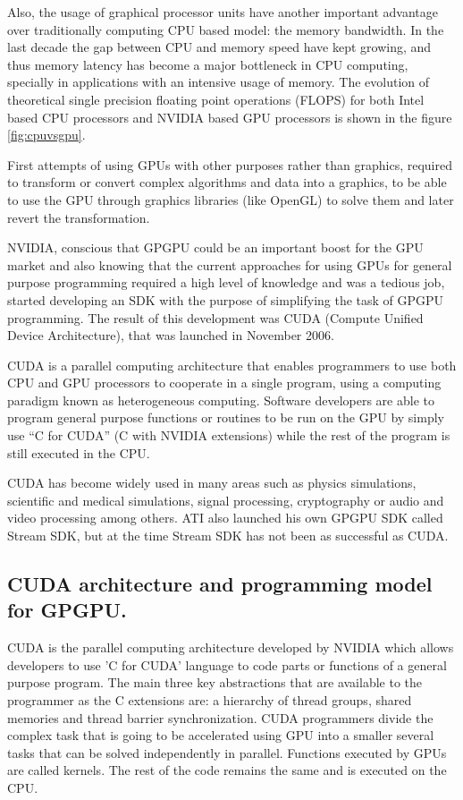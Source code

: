 \documentclass[thesis=M,english]{FITthesis}[2011/07/15]
\begin{document}
Also, the usage of graphical processor units have another important advantage over traditionally computing CPU based model: the memory bandwidth. In the last decade the gap between CPU and memory speed have kept growing, and thus memory latency has become a major bottleneck in CPU computing, specially in applications with an intensive usage of memory. The evolution of theoretical single precision floating point operations (FLOPS) for both Intel based CPU processors and NVIDIA based GPU processors is shown in the figure \ref{fig:cpuvsgpu}. 

First attempts of using GPUs with other purposes rather than graphics, required to transform or convert complex algorithms and data into a graphics, to be able to use the GPU through graphics libraries (like OpenGL) to solve them and later revert the transformation. 

NVIDIA, conscious that GPGPU could be an important boost for the GPU market and also knowing that the current approaches for using GPUs for general purpose programming required a high level of knowledge and was a tedious job, started developing an SDK with the purpose of simplifying the task of GPGPU programming. The result of this development was CUDA (Compute Unified Device Architecture), that was launched in November 2006. 

CUDA is a parallel computing architecture that enables programmers to use both CPU and GPU processors to cooperate in a single program, using a computing paradigm known as heterogeneous computing. Software developers are able to program general purpose functions or routines to be run on the GPU by simply use “C for CUDA” (C with NVIDIA extensions) while the rest of the program is still executed in the CPU. 

CUDA has become widely used in many areas such as physics simulations, scientific and medical simulations, signal processing, cryptography or audio and video processing among others. ATI also launched his own GPGPU SDK called Stream SDK, but at the time Stream SDK has not been as successful as CUDA.

\subsection{CUDA architecture and programming model for GPGPU.}

CUDA is the parallel computing architecture developed by NVIDIA which allows developers to use 'C for CUDA' language to code parts or functions of a general purpose program. The main three key abstractions that are available to the programmer as the C extensions are: a hierarchy of thread groups, shared memories and thread barrier synchronization. CUDA programmers divide the complex task that is going to be accelerated using GPU into a smaller several tasks that can be solved independently in parallel. Functions executed by GPUs are called kernels. The rest of the code remains the same and is executed on the CPU.
\end{document}
